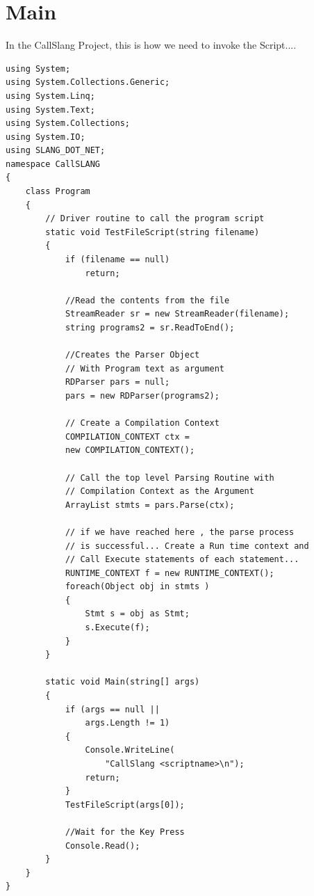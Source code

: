 \section{Main}
In the CallSlang Project, this is how we need to invoke the Script....
\lstset{style=csharp}
\begin{lstlisting}
using System;
using System.Collections.Generic;
using System.Linq;
using System.Text;
using System.Collections;
using System.IO;
using SLANG_DOT_NET;
namespace CallSLANG
{
	class Program
	{
		// Driver routine to call the program script
		static void TestFileScript(string filename)
		{
			if (filename == null)
				return;
			
			//Read the contents from the file
			StreamReader sr = new StreamReader(filename);
			string programs2 = sr.ReadToEnd();
			
			//Creates the Parser Object
			// With Program text as argument
			RDParser pars = null;
			pars = new RDParser(programs2);

			// Create a Compilation Context
			COMPILATION_CONTEXT ctx = 
			new COMPILATION_CONTEXT();

			// Call the top level Parsing Routine with
			// Compilation Context as the Argument
			ArrayList stmts = pars.Parse(ctx);
			
			// if we have reached here , the parse process
			// is successful... Create a Run time context and
			// Call Execute statements of each statement...
			RUNTIME_CONTEXT f = new RUNTIME_CONTEXT();
			foreach(Object obj in stmts )
			{
				Stmt s = obj as Stmt;
				s.Execute(f);
			}
		}
		
		static void Main(string[] args)
		{
			if (args == null ||
				args.Length != 1)
			{
				Console.WriteLine(
					"CallSlang <scriptname>\n");
				return;
			}
			TestFileScript(args[0]);
			
			//Wait for the Key Press
			Console.Read();
		}
	} 
}
\end{lstlisting}
